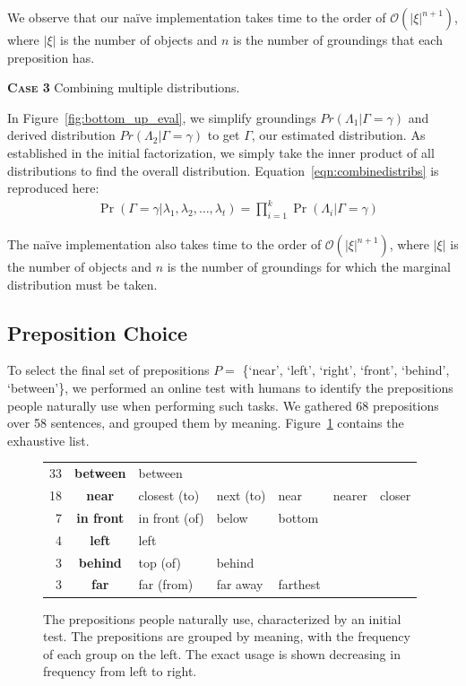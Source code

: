 \documentclass[conference]{IEEEtran}
\numberwithin{equation}{section}
\begin{document}
We observe that our na\"ive implementation takes time to the order of $\mathcal{O}(|\xi|^{n+1})$, where $|\xi|$ is the number of objects and $n$ is the number of groundings that each preposition has.


\textbf{\textsc{Case 3}} Combining multiple distributions.

In Figure~\ref{fig:bottom_up_eval}, we simplify groundings $Pr(\Lambda_1 | \Gamma = \gamma)$ and derived distribution $Pr(\Lambda_2 | \Gamma = \gamma)$ to get $\Gamma$, our estimated distribution. As established in the initial factorization, we simply take the inner product of all distributions to find the overall distribution. Equation~\ref{eqn:combinedistribs} is reproduced here:
\begin{align*}
& \Pr(\Gamma = \gamma | \lambda_1, \lambda_2, \ldots, \lambda_t) = \prod_{i=1}^k \Pr(\Lambda_i | \Gamma = \gamma)
\end{align*}

The na\"ive implementation also takes time to the order of $\mathcal{O}(|\xi|^{n+1})$, where $|\xi|$ is the number of objects and $n$ is the number of groundings for which the marginal distribution must be taken.

\subsection{Preposition Choice}
\label{sec:prepselect}

To select the final set of prepositions $P = $ \{`near', `left', `right', `front', `behind', `between'\}, we performed an online test with humans to identify the prepositions people naturally use when performing such tasks. We gathered 68 prepositions over 58 sentences, and grouped them by meaning. Figure~\ref{fig:prepositionlist} contains the exhaustive list.

\begin{figure}[h!]
  \small
  \centering
  \raggedright
  \setlength\tabcolsep{2pt}
  \begin{tabular}{|r c lllll|}\hline
  33 & \textbf{between} & between &&&& \\
  18 & \textbf{near} & closest (to) & next (to) & near & nearer & closer  \\
  7 & \textbf{in front} & in front (of) & below & bottom && \\
  4 & \textbf{left} & left &&&& \\
  3 & \textbf{behind} & top (of) & behind &&& \\
  3 & \textbf{far} & far (from) & far away & farthest && \\\hline
  \end{tabular}
  \caption{The prepositions people naturally use, characterized by an initial test. The prepositions are grouped by meaning, with the frequency of each group on the left. The exact usage is shown decreasing in frequency from left to right.}
  \label{fig:prepositionlist}
\end{figure}
\end{document}
